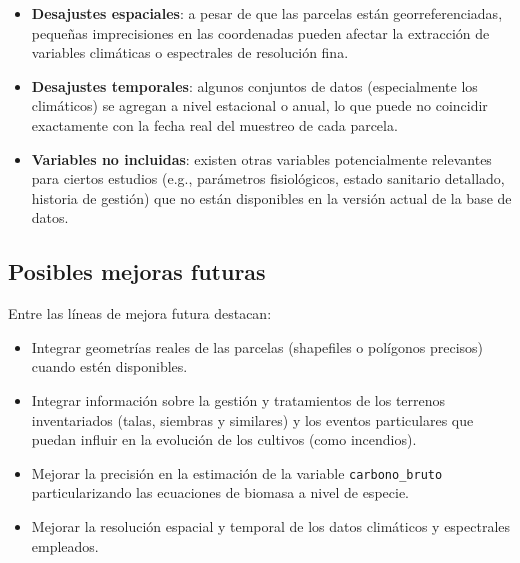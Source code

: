 \begin{itemize}
    \item \textbf{Desajustes espaciales}: a pesar de que las parcelas están georreferenciadas, pequeñas imprecisiones en las coordenadas pueden afectar la extracción de variables climáticas o espectrales de resolución fina.
    
    \item \textbf{Desajustes temporales}: algunos conjuntos de datos (especialmente los climáticos) se agregan a nivel estacional o anual, lo que puede no coincidir exactamente con la fecha real del muestreo de cada parcela.
    
    \item \textbf{Variables no incluidas}: existen otras variables potencialmente relevantes para ciertos estudios (e.g., parámetros fisiológicos, estado sanitario detallado, historia de gestión) que no están disponibles en la versión actual de la base de datos.
\end{itemize}

\subsection*{Posibles mejoras futuras}

Entre las líneas de mejora futura destacan:

\begin{itemize}
    \item Integrar geometrías reales de las parcelas (shapefiles o polígonos precisos) cuando estén disponibles.
    \item Integrar información sobre la gestión y tratamientos de los terrenos inventariados (talas, siembras y similares) y los eventos particulares que puedan influir en la evolución de los cultivos (como incendios).
    \item Mejorar la precisión en la estimación de la variable \texttt{carbono\_bruto} particularizando las ecuaciones de biomasa a nivel de especie. 
    \item Mejorar la resolución espacial y temporal de los datos climáticos y espectrales empleados.
\end{itemize}

